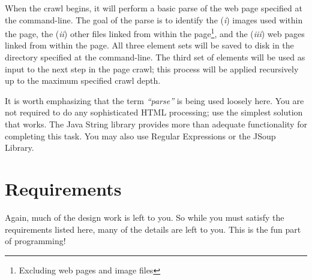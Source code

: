 \documentclass[11pt]{article}
\begin{document}
When the crawl begins, it will perform a basic parse of the web page specified
at the command-line. The goal of the parse is to identify the ({\em i}) images 
used within the page, the ({\em ii}) other files linked from within the page\footnote{Excluding 	
web pages and image files}, and the ({\em iii}) web pages linked from
within the page. All three element sets will be saved to disk in the
directory specified at the command-line. The third set of elements will be used
as input to the next step in the page crawl; this process will be applied
recursively up to the maximum specified crawl depth.

It is worth emphasizing that the term {\em ``parse''} is being used
loosely here. You are not required to do any sophisticated HTML 
processing; use the simplest solution that works. The Java String 
library provides more than adequate functionality for completing this
task.  You may also use Regular Expressions or the JSoup Library.

\section{Requirements}
Again, much of the design work is left to you. So while you must satisfy
the requirements listed here, many of the details are left to you. This
is the fun part of programming!
\end{document}
